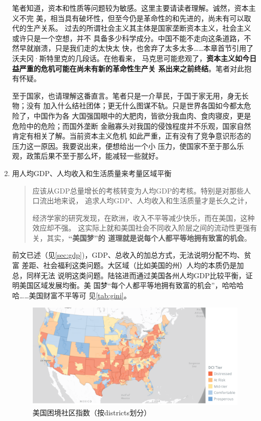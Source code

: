 \begin{enumerate}
  笔者知道，资本和性质等问题较为敏感。这里主要请读者理解。诚然，资本主义不完
  美，相当具有破坏性，但至今仍是革命性的和先进的，尚未有可以取代的生产关系。
  过去的所谓社会主义其主体是国家垄断资本主义，社会主义或许只是一个空想，并不
  具备多少科学成分。中国不能不走向这条道路，不然早就崩溃，只是我们走的太快太
  快，也舍弃了太多太多……本章首节引用了沃夫冈·斯特里克的几段话。在他看来，
  马克思可能悲观了，\textbf{资本主义如今日益严重的危机可能在尚未有新的革命性生产关
    系出来之前终结}。笔者对此抱有怀疑。

  至于国家，也请理解这番直言。笔者只是一介草民，于国于家无用，身无长物；没有
  加入什么结社团体；更无什么图谋不轨。只是世界各国如今都太危险了，中国作为各
  大国强国眼中的大肥肉，皆欲分我血肉、食肉寝皮，更是危险中的危险；而国外垄断
  金融寡头对我国的侵蚀程度并不乐观，国家自然肯定有相关了解。当前资本主义危机
  如此严重，正有没有了竞争意识形态的压力这一原因。我要说出来，便想给出一个小
  压力，使国家不至于那么乐观，政策后果不至于那么坏，能减轻一些就好。


\item 用人均GDP、人均收入和生活质量来考量区域平衡

  \begin{quotation}
    应该从GDP总量增长的考核转变为人均GDP的考核。特别是对那些人口流出地来说，
    追求人均GDP、人均收入和生活质量才是长久之计，

    经济学家的研究发现，在欧洲，收入不平等减少快乐，而在美国，这种效应却不强。
    这实际上就和美国社会不同收入阶层之间的流动性更强有关，其实，\textbf{“美国梦”的
      道理就是说每个人都平等地拥有致富的机会}。
  \end{quotation}

  前文已述（见\cref{sec:gdp})，GDP、总收入的加总方式，无法说明分配不均、贫富
  差距、社会福利这类问题。大区域（比如美国的州）人均的本质仍是加总，同样无法
  说明这类问题。陆铭进而通过美国各州人均GDP比较平衡，证明美国区域发展均衡。美
  国梦“每个人都平等地拥有致富的机会”，哈哈哈哈……美国财富不平等可
  见\cref{tab:gini}。

  \begin{figure}[ht]
    \centering
    \includegraphics[options]{figures/DCIbyDistricts.png}
    \caption{\label{fig:DCIbyD}美国困境社区指数（按districts划分）}
  \end{figure}


\end{enumerate}
